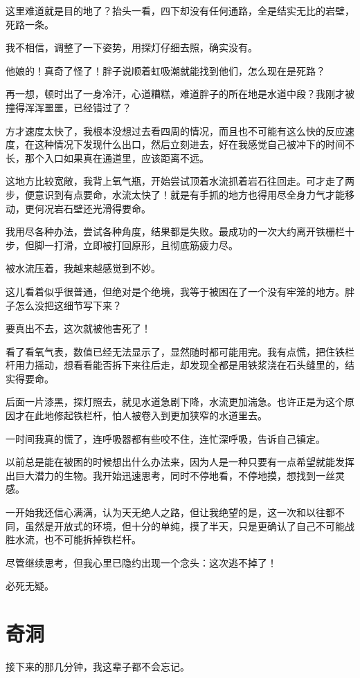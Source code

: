 这里难道就是目的地了？抬头一看，四下却没有任何通路，全是结实无比的岩壁，死路一条。

我不相信，调整了一下姿势，用探灯仔细去照，确实没有。

他娘的！真奇了怪了！胖子说顺着虹吸潮就能找到他们，怎么现在是死路？

再一想，顿时出了一身冷汗，心道糟糕，难道胖子的所在地是水道中段？我刚才被撞得浑浑噩噩，已经错过了？

方才速度太快了，我根本没想过去看四周的情况，而且也不可能有这么快的反应速度，在这种情况下发现什么出口，然后立刻进去，好在我感觉自己被冲下的时间不长，那个入口如果真在通道里，应该距离不远。

这地方比较宽敞，我背上氧气瓶，开始尝试顶着水流抓着岩石往回走。可才走了两步，便意识到有点要命，水流太快了！就是有手抓的地方也得用尽全身力气才能移动，更何况岩石壁还光滑得要命。

我用尽各种办法，尝试各种角度，结果都是失败。最成功的一次大约离开铁栅栏十步，但脚一打滑，立即被打回原形，且彻底筋疲力尽。

被水流压着，我越来越感觉到不妙。

这儿看着似乎很普通，但绝对是个绝境，我等于被困在了一个没有牢笼的地方。胖子怎么没把这细节写下来？

要真出不去，这次就被他害死了！

看了看氧气表，数值已经无法显示了，显然随时都可能用完。我有点慌，把住铁栏杆用力摇动，想看看能否拆下来往后走，却发现全都是用铁浆浇在石头缝里的，结实得要命。

后面一片漆黑，探灯照去，就见水道急剧下降，水流更加湍急。也许正是为这个原因才在此地修起铁栏杆，怕人被卷入到更加狭窄的水道里去。

一时间我真的慌了，连呼吸器都有些咬不住，连忙深呼吸，告诉自己镇定。

以前总是能在被困的时候想出什么办法来，因为人是一种只要有一点希望就能发挥出巨大潜力的生物。我开始迅速思考，同时不停地看，不停地摸，想找到一丝灵感。

一开始我还信心满满，认为天无绝人之路，但让我绝望的是，这一次和以往都不同，虽然是开放式的环境，但十分的单纯，摸了半天，只是更确认了自己不可能战胜水流，也不可能拆掉铁栏杆。

尽管继续思考，但我心里已隐约出现一个念头：这次逃不掉了！

必死无疑。

\chapter{奇洞}

接下来的那几分钟，我这辈子都不会忘记。


